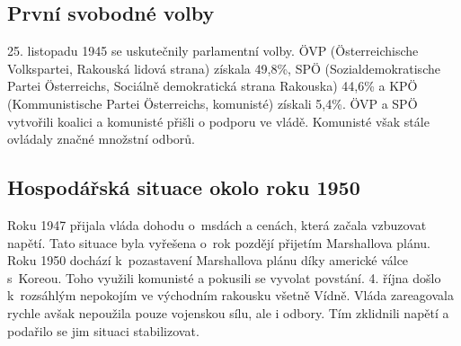 \documentclass[a3 paper]{article}
\begin{document}
\begin{landscape}
\begin{minipage}[c]{\linewidth}
\begin{minipage}[t]{0.5\linewidth}
\begin{minipage}[t]{\linewidth}
\end{minipage}
	\subsection*{První svobodné volby}
	25. listopadu 1945 se uskutečnily parlamentní volby. ÖVP (Österreichische Volkspartei, Rakouská lidová strana) získala 49,8\%, SPÖ (Sozialdemokratische Partei Österreichs, Sociálně demokratická strana Rakouska) 44,6\% a KPÖ (Kommunistische Partei Österreichs, komunisté) získali 5,4\%. ÖVP a SPÖ vytvořili koalici a komunisté přišli o podporu ve vládě. Komunisté však stále ovládaly značné množstní odborů.
	\subsection*{Hospodářská situace okolo roku 1950}
	Roku 1947 přijala vláda dohodu o~msdách a cenách, která začala vzbuzovat napětí. Tato situace byla vyřešena o~rok pozdějí přijetím Marshallova plánu. Roku 1950 dochází k~pozastavení Marshallova plánu díky americké válce s~Koreou. Toho využili komunisté a pokusili se vyvolat povstání. 4. října došlo k~rozsáhlým nepokojím ve východním rakousku všetně Vídně. Vláda zareagovala rychle avšak nepoužila pouze vojenskou sílu, ale i odbory. Tím zklidnili napětí a podařilo se jim situaci stabilizovat.

\end{minipage}
\end{minipage}
\end{landscape}
\end{document}
